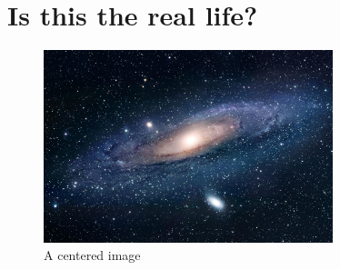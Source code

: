 \section{Is this the real life?}



\begin{figure}[H]
	\centering
	\includegraphics[width=0.75\textwidth]{res/sample-image.jpeg}
	\caption{A centered image}
	\label{fig::sample-label}
\end{figure}


